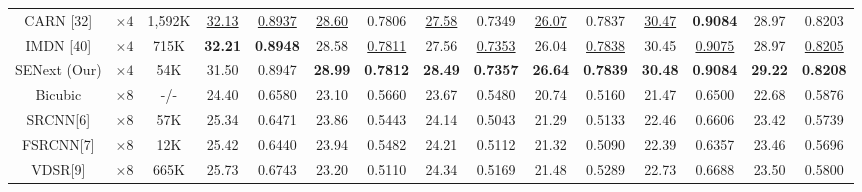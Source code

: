 \documentclass{ieeeaccess}
\begin{document}
\begin{table}
\begin{tabular}{|c|c|c|cc|cc|cc|cc|cc|cc|}
CARN [32] & $\times4$  & 1,592K&\multicolumn{1}{c|}{\color{blue}\underline{32.13}} &{\color{blue}\underline{0.8937}} & \multicolumn{1}{c|}{\color{blue}\underline{28.60}} &0.7806& \multicolumn{1}{c|}{\color{blue}\underline{27.58}} &0.7349& \multicolumn{1}{c|}{\color{blue}\underline{26.07}} &0.7837& \multicolumn{1}{c|}{\color{blue}\underline{30.47}} &{\color{red}\textbf{0.9084}} &\multicolumn{1}{c|}{28.97} &0.8203 \\

IMDN [40] & $\times4$  &715K& \multicolumn{1}{c|}{\color{red}\textbf{32.21}} &{\color{red}\textbf{0.8948}} & \multicolumn{1}{c|}{28.58} &{\color{blue}\underline{0.7811}}& \multicolumn{1}{c|}{27.56} &{\color{blue}\underline{0.7353}} & \multicolumn{1}{c|}{26.04} &{\color{blue}\underline{0.7838}}& \multicolumn{1}{c|}{30.45} &{\color{blue}\underline{0.9075}} &\multicolumn{1}{c|}{28.97} &{\color{blue}\underline{0.8205}}  \\

SENext (Our) & $\times4$  &54K& \multicolumn{1}{c|}{31.50} &0.8947  & \multicolumn{1}{c|}{\color{red}\textbf{28.99}} &{\color{red}\textbf{0.7812}}  & \multicolumn{1}{c|}{\color{red}\textbf{28.49}} &{\color{red}\textbf{0.7357}} & \multicolumn{1}{c|}{\color{red}\textbf{26.64 }} &{\color{red}\textbf{0.7839}}  & \multicolumn{1}{c|}{\color{red}\textbf{30.48}} &{\color{red}\textbf{0.9084}}
&\multicolumn{1}{c|}{\color{red}\textbf{29.22}} &{\color{red}\textbf{0.8208}}    \\
\hline

Bicubic&$\times8$ &-/-& \multicolumn{1}{c|}{24.40} &0.6580& \multicolumn{1}{c|}{23.10} &0.5660 & \multicolumn{1}{c|}{23.67} &0.5480& \multicolumn{1}{c|}{20.74} &0.5160 & \multicolumn{1}{c|}{21.47} & 0.6500
&\multicolumn{1}{c|}{22.68} & 0.5876     \\


SRCNN[6] & $\times8$ &57K& \multicolumn{1}{c|}{25.34} & 0.6471 & \multicolumn{1}{c|}{23.86} &0.5443 &\multicolumn{1}{c|}{24.14} &0.5043 & \multicolumn{1}{c|}{21.29} &0.5133& \multicolumn{1}{c|}{22.46} &0.6606
&\multicolumn{1}{c|}{23.42} & 0.5739      \\

FSRCNN[7]& $\times8$&12K& \multicolumn{1}{c|}{25.42} &0.6440 & \multicolumn{1}{c|}{23.94} &0.5482&\multicolumn{1}{c|}{24.21} &0.5112 & \multicolumn{1}{c|}{21.32} &0.5090 & \multicolumn{1}{c|}{22.39} & 0.6357
&\multicolumn{1}{c|}{23.46} &  0.5696      \\

VDSR[9]& $\times8$&665K& \multicolumn{1}{c|}{25.73} &0.6743& \multicolumn{1}{c|}{23.20} &0.5110 &\multicolumn{1}{c|}{24.34} &0.5169 & \multicolumn{1}{c|}{21.48} &0.5289 & \multicolumn{1}{c|}{22.73} &0.6688
&\multicolumn{1}{c|}{23.50} & 0.5800       \\


\end{tabular}
\end{table}
\end{document}
